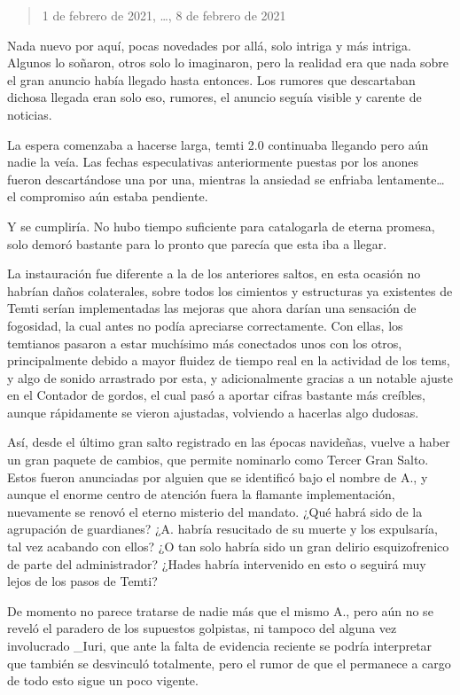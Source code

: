 \documentclass[
]{book}
\begin{document}
\begin{quote}
1 de febrero de 2021, \ldots, 8 de febrero de 2021
\end{quote}

Nada nuevo por aquí, pocas novedades por allá, solo intriga y más intriga. Algunos lo soñaron, otros solo lo imaginaron, pero la realidad era que nada sobre el gran anuncio había llegado hasta entonces. Los rumores que descartaban dichosa llegada eran solo eso, rumores, el anuncio seguía visible y carente de noticias.

La espera comenzaba a hacerse larga, temti 2.0 continuaba llegando pero aún nadie la veía. Las fechas especulativas anteriormente puestas por los anones fueron descartándose una por una, mientras la ansiedad se enfriaba lentamente\ldots{} el compromiso aún estaba pendiente.

Y se cumpliría. No hubo tiempo suficiente para catalogarla de eterna promesa, solo demoró bastante para lo pronto que parecía que esta iba a llegar.

La instauración fue diferente a la de los anteriores saltos, en esta ocasión no habrían daños colaterales, sobre todos los cimientos y estructuras ya existentes de Temti serían implementadas las mejoras que ahora darían una sensación de fogosidad, la cual antes no podía apreciarse correctamente. Con ellas, los temtianos pasaron a estar muchísimo más conectados unos con los otros, principalmente debido a mayor fluidez de tiempo real en la actividad de los tems, y algo de sonido arrastrado por esta, y adicionalmente gracias a un notable ajuste en el Contador de gordos, el cual pasó a aportar cifras bastante más creíbles, aunque rápidamente se vieron ajustadas, volviendo a hacerlas algo dudosas.

Así, desde el último gran salto registrado en las épocas navideñas, vuelve a haber un gran paquete de cambios, que permite nominarlo como Tercer Gran Salto. Estos fueron anunciadas por alguien que se identificó bajo el nombre de A., y aunque el enorme centro de atención fuera la flamante implementación, nuevamente se renovó el eterno misterio del mandato. ¿Qué habrá sido de la agrupación de guardianes? ¿A. habría resucitado de su muerte y los expulsaría, tal vez acabando con ellos? ¿O tan solo habría sido un gran delirio esquizofrenico de parte del administrador? ¿Hades habría intervenido en esto o seguirá muy lejos de los pasos de Temti?

De momento no parece tratarse de nadie más que el mismo A., pero aún no se reveló el paradero de los supuestos golpistas, ni tampoco del alguna vez involucrado \_Iuri, que ante la falta de evidencia reciente se podría interpretar que también se desvinculó totalmente, pero el rumor de que el permanece a cargo de todo esto sigue un poco vigente.
\end{document}
